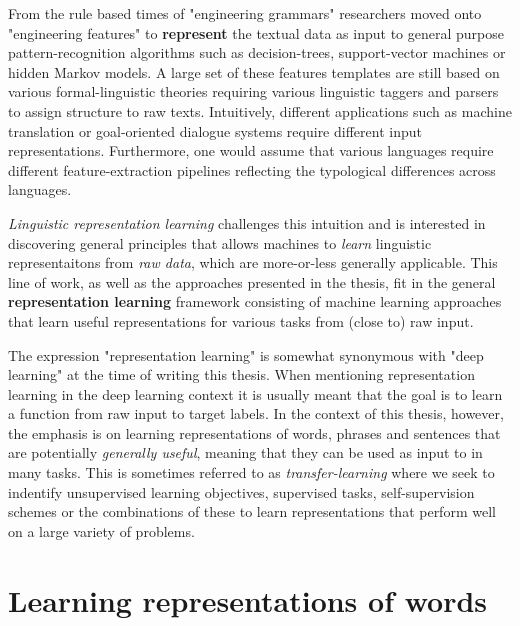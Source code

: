 From the rule based times of "engineering grammars" researchers moved onto "engineering features"
to \textbf{represent} the textual data as input to general purpose pattern-recognition algorithms such as
decision-trees, support-vector machines or hidden Markov models. 
A large set of these features templates are still based on various formal-linguistic theories requiring various 
linguistic taggers and parsers to assign structure to raw texts.
Intuitively, different applications such as machine translation or goal-oriented dialogue systems 
require different input representations. Furthermore, one would assume that various languages require 
different feature-extraction pipelines reflecting the typological differences across languages. 

\emph{Linguistic representation learning} challenges this intuition and is interested in 
discovering general principles that allows machines to  \emph{learn} 
linguistic representaitons from \emph{raw data}, which are more-or-less
generally applicable. This line of work, as well as the approaches presented in the thesis,
fit in the general \textbf{representation learning}  framework consisting of 
machine learning approaches that learn useful representations 
for various tasks from (close to) raw input.

The expression "representation learning" is somewhat synonymous with "deep learning" at the time
of writing this thesis. When mentioning representation learning in the deep learning context
it is usually meant that the goal is to learn a function from raw input to target labels. In the 
context of this thesis, however, the emphasis is on learning representations of words, phrases and 
sentences that are potentially \emph{generally useful}, meaning 
that they can be used as input to in many tasks. This is sometimes referred to as 
\emph{transfer-learning} where we seek to indentify unsupervised learning objectives, 
supervised tasks, self-supervision schemes or the combinations of these to  learn representations that
perform well on a large variety of problems. 

\section{Learning representations of words}


